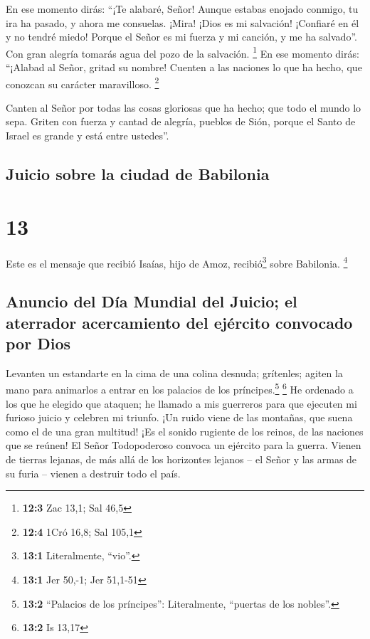  En ese momento dirás: ``¡Te alabaré, Señor! Aunque
estabas enojado conmigo, tu ira ha pasado, y ahora me consuelas.
 ¡Mira! ¡Dios es mi salvación! ¡Confiaré en él y no tendré
miedo! Porque el Señor es mi fuerza y mi canción, y me ha salvado''.
 Con gran alegría tomarás agua del pozo de la salvación.
\footnote{\textbf{12:3} Zac 13,1; Sal 46,5}  En ese
momento dirás: ``¡Alabad al Señor, gritad su nombre! Cuenten a las
naciones lo que ha hecho, que conozcan su carácter maravilloso.
\footnote{\textbf{12:4} 1Cró 16,8; Sal 105,1}

 Canten al Señor por todas las cosas gloriosas que ha
hecho; que todo el mundo lo sepa.  Griten con fuerza y
cantad de alegría, pueblos de Sión, porque el Santo de Israel es grande
y está entre ustedes''.

\hypertarget{juicio-sobre-la-ciudad-de-babilonia}{%
\subsection{Juicio sobre la ciudad de
Babilonia}\label{juicio-sobre-la-ciudad-de-babilonia}}

\hypertarget{section-12}{%
\section{13}\label{section-12}}

 Este es el mensaje que recibió Isaías, hijo de Amoz,
recibió\footnote{\textbf{13:1} Literalmente, ``vio''.} sobre Babilonia.
\footnote{\textbf{13:1} Jer 50,-1; Jer 51,1-51}

\hypertarget{anuncio-del-duxeda-mundial-del-juicio-el-aterrador-acercamiento-del-ejuxe9rcito-convocado-por-dios}{%
\subsection{Anuncio del Día Mundial del Juicio; el aterrador
acercamiento del ejército convocado por
Dios}\label{anuncio-del-duxeda-mundial-del-juicio-el-aterrador-acercamiento-del-ejuxe9rcito-convocado-por-dios}}

 Levanten un estandarte en la cima de una colina desnuda;
grítenles; agiten la mano para animarlos a entrar en los palacios de los
príncipes.\footnote{\textbf{13:2} ``Palacios de los príncipes'':
  Literalmente, ``puertas de los nobles''.} \footnote{\textbf{13:2} Is
  13,17}  He ordenado a los que he elegido que ataquen; he
llamado a mis guerreros para que ejecuten mi furioso juicio y celebren
mi triunfo.  ¡Un ruido viene de las montañas, que suena
como el de una gran multitud! ¡Es el sonido rugiente de los reinos, de
las naciones que se reúnen! El Señor Todopoderoso convoca un ejército
para la guerra.  Vienen de tierras lejanas, de más allá de
los horizontes lejanos -- el Señor y las armas de su furia -- vienen a
destruir todo el país.

